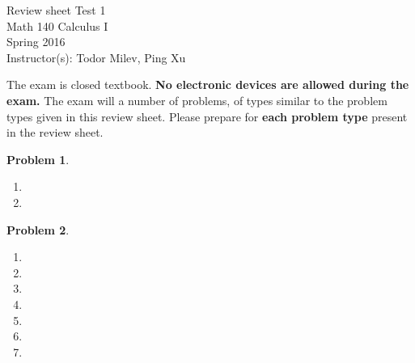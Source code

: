 \documentclass{article}
\renewcommand{\fcProblemRef}{\theproblem.\theenumi}
\newtheorem{problem}{Problem}
\begin{document}
\begin{center}
\Large
Review sheet Test 1 \\ Math 140 Calculus I \\ \normalsize Spring 2016 \\ Instructor(s): Todor Milev, Ping Xu
\end{center}



\noindent The exam is closed textbook. \textbf{No electronic devices are allowed during the exam. } The exam will a number of problems, of types similar to the problem types given in this review sheet. Please prepare for \textbf{each problem type} present in the review sheet. %

\begin{problem}~
\begin{multicols}{2}
\begin{enumerate}[ref={\fcProblemRef}]
\item 
\item 
\end{enumerate}
\end{multicols}
\end{problem}

\begin{problem}~
\begin{multicols}{2}
\begin{enumerate}[ref={\fcProblemRef}]
\item 
\item 

\item 
\item 
\item 
\item 

\item 

\end{enumerate}
\end{multicols}
\end{problem}

\end{document}
